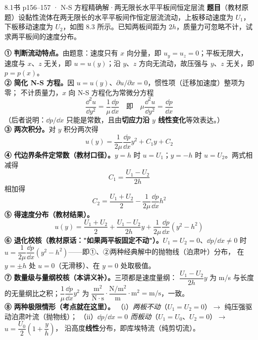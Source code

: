 \begin{liti}{8.1}{书 p156--157 · N-S 方程精确解·两无限长水平平板间恒定层流}
\textbf{题目}（教材原题）设黏性流体在两无限长的水平平板间作恒定层流流动，上板移动速度为 $U_1$，
下板移动速度为 $U_2$，如图 8.3 所示。已知两板间距为 $2h$，质量力可忽略不计，试求两平板间的速度分布。


\begin{jie}
\textbf{① 判断流动特点。}由题意：速度只有 $x$ 向分量，即 $u_y=u_z=0$；平板无限大，
速度与 $x$、$z$ 无关，即 $u=u(y)$；沿 $y$、$z$ 方向无流动，故压强与 $y$、$z$ 无关，即 $p=p(x)$。\\
\textbf{② 简化 N-S 方程。}因 $u=u(y)$、$\partial u/\partial x=0$，惯性项（迁移加速度）整项为零；
不计质量力，$x$ 向 N-S 方程化为常微分方程
\[ \frac{\dd^2u}{\dd y^2}=\frac{1}{\mu}\frac{\dd p}{\dd x}\quad\text{即}\quad
   \mu\frac{\dd^2u}{\dd y^2}=\frac{\dd p}{\dd x} \]
（后者说明：$\dd p/\dd x$ 只能是常数，且由\textbf{切应力沿 $y$ 线性变化}等效表达。）\\
\textbf{③ 两次积分。}对 $y$ 积分两次得
\[ u(y)=\frac{1}{2\mu}\frac{\dd p}{\dd x}y^2+C_1y+C_2 \]
\textbf{④ 代边界条件定常数（教材口径）。}$y=h$ 时 $u=U_1$；$y=-h$ 时 $u=U_2$。两式相减得
\[ C_1=\frac{U_1-U_2}{2h} \]
相加得
\[ C_2=\frac{U_1+U_2}{2}-\frac{1}{2\mu}\frac{\dd p}{\dd x}h^2 \]
\textbf{⑤ 得速度分布（教材结果）。}
\[ u(y)=\frac{U_1+U_2}{2}+\frac{U_1-U_2}{2h}y
   +\frac{1}{2\mu}\frac{\dd p}{\dd x}\left(y^2-h^2\right) \]
\textbf{⑥ 退化校核（教材原话："如果两平板固定不动"）。}$U_1=U_2=0$、$\dd p/\dd x\neq0$ 时
$u=\dfrac{1}{2\mu}\dfrac{\dd p}{\dd x}\left(y^2-h^2\right)$——即①、②两种经典解中的抛物线（泊肃叶）分布，
在 $y=\pm h$ 处 $u=0$（无滑移）、在 $y=0$ 处取极值。\\
\textbf{⑦ 数量级与量纲校核（本讲义补）。}三项都是速度量纲：
$\dfrac{U_1-U_2}{2h}y$ 为 m/s 与长度的无量纲比之积；$\dfrac{1}{\mu}\dfrac{\dd p}{\dd x}y^2$ 为
$\dfrac{\mathrm{m^2}}{\mathrm{N\cdot s}}\cdot\dfrac{\mathrm{N/m^2}}{\mathrm m}\cdot\mathrm{m^2}=\mathrm{m/s}$，一致。\\
\textbf{⑧ 两种极限情形（考点就在这里）。}
（i）\emph{两板不动}（$U_1=U_2=0$）$\to$ 纯压强驱动泊肃叶流（抛物线）；
（ii）\emph{$\dd p/\dd x=0$ 而板动}（$U_1=U_0$、$U_2=0$）$\to$ $u=\dfrac{U_0}{2}\left(1+\dfrac{y}{h}\right)$，
沿高度\textbf{线性}分布，即库埃特流（纯剪切流）。
\end{jie}


\end{liti}
